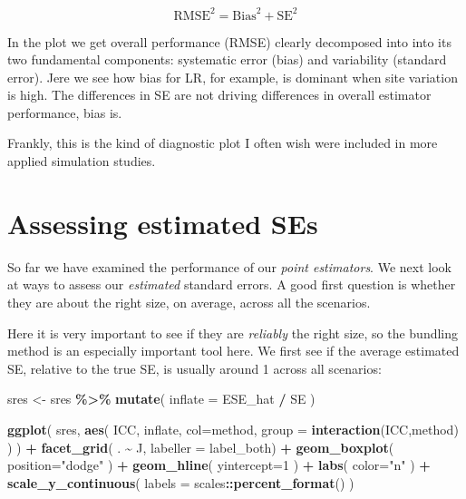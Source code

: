 \documentclass[
]{book}
\newenvironment{Shaded}{\begin{snugshade}}{\end{snugshade}}
\newcommand{\AttributeTok}[1]{\textcolor[rgb]{0.13,0.29,0.53}{#1}}
\newcommand{\DecValTok}[1]{\textcolor[rgb]{0.00,0.00,0.81}{#1}}
\newcommand{\FunctionTok}[1]{\textcolor[rgb]{0.13,0.29,0.53}{\textbf{#1}}}
\newcommand{\NormalTok}[1]{#1}
\newcommand{\OtherTok}[1]{\textcolor[rgb]{0.56,0.35,0.01}{#1}}
\newcommand{\SpecialCharTok}[1]{\textcolor[rgb]{0.81,0.36,0.00}{\textbf{#1}}}
\newcommand{\StringTok}[1]{\textcolor[rgb]{0.31,0.60,0.02}{#1}}
\begin{document}
\[ \text{RMSE}^2 = \text{Bias}^2 + \text{SE}^2 \]

In the plot we get overall performance (RMSE) clearly decomposed into into its two fundamental components: systematic error (bias) and variability (standard error).
Jere we see how bias for LR, for example, is dominant when site variation is high.
The differences in SE are not driving differences in overall estimator performance, bias is.

Frankly, this is the kind of diagnostic plot I often wish were included in more applied simulation studies.

\section{Assessing estimated SEs}\label{assessing-estimated-ses}

So far we have examined the performance of our \emph{point estimators}.
We next look at ways to assess our \emph{estimated} standard errors.
A good first question is whether they are about the right size, on average, across all the scenarios.

Here it is very important to see if they are \emph{reliably} the right size, so the bundling method is an especially important tool here.
We first see if the average estimated SE, relative to the true SE, is usually around 1 across all scenarios:

\begin{Shaded}
\begin{Highlighting}[]
\NormalTok{sres }\OtherTok{\textless{}{-}}\NormalTok{ sres }\SpecialCharTok{\%\textgreater{}\%}
  \FunctionTok{mutate}\NormalTok{( }\AttributeTok{inflate =}\NormalTok{ ESE\_hat }\SpecialCharTok{/}\NormalTok{ SE  ) }

\FunctionTok{ggplot}\NormalTok{( sres,}
        \FunctionTok{aes}\NormalTok{( ICC, inflate, }\AttributeTok{col=}\NormalTok{method,}
             \AttributeTok{group =} \FunctionTok{interaction}\NormalTok{(ICC,method) ) ) }\SpecialCharTok{+}
    \FunctionTok{facet\_grid}\NormalTok{( . }\SpecialCharTok{\textasciitilde{}}\NormalTok{ J, }\AttributeTok{labeller =}\NormalTok{ label\_both) }\SpecialCharTok{+}
  \FunctionTok{geom\_boxplot}\NormalTok{( }\AttributeTok{position=}\StringTok{"dodge"}\NormalTok{ ) }\SpecialCharTok{+}
  \FunctionTok{geom\_hline}\NormalTok{( }\AttributeTok{yintercept=}\DecValTok{1}\NormalTok{ ) }\SpecialCharTok{+}
  \FunctionTok{labs}\NormalTok{( }\AttributeTok{color=}\StringTok{"n"}\NormalTok{ ) }\SpecialCharTok{+}
  \FunctionTok{scale\_y\_continuous}\NormalTok{( }\AttributeTok{labels =}\NormalTok{ scales}\SpecialCharTok{::}\FunctionTok{percent\_format}\NormalTok{() ) }
\end{Highlighting}
\end{Shaded}
\end{document}
